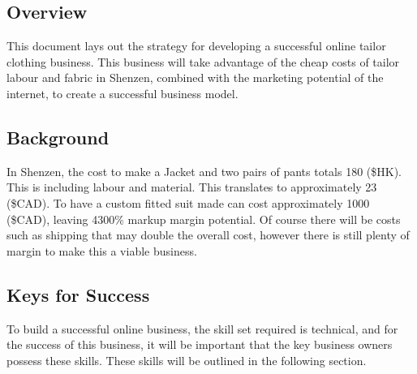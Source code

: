 \subsection{Overview}

This document lays out the strategy for developing a successful online tailor clothing business.  This business will take advantage of the cheap costs of tailor labour and fabric in Shenzen, combined with the marketing potential of the internet, to create a successful business model.

\subsection{Background}

In Shenzen, the cost to make a Jacket and two pairs of pants totals 180 (\$HK).  This is including labour and material.  This translates to approximately 23 (\$CAD).  To have a custom fitted suit made can cost approximately 1000 (\$CAD), leaving 4300\% markup margin potential.  Of course there will be costs such as shipping that may double the overall cost, however there is still plenty of margin to make this a viable business.

\subsection{Keys for Success}

To build a successful online business, the skill set required is technical, and for the success of this business, it will be important that the key business owners possess these skills.  These skills will be outlined in the following section.